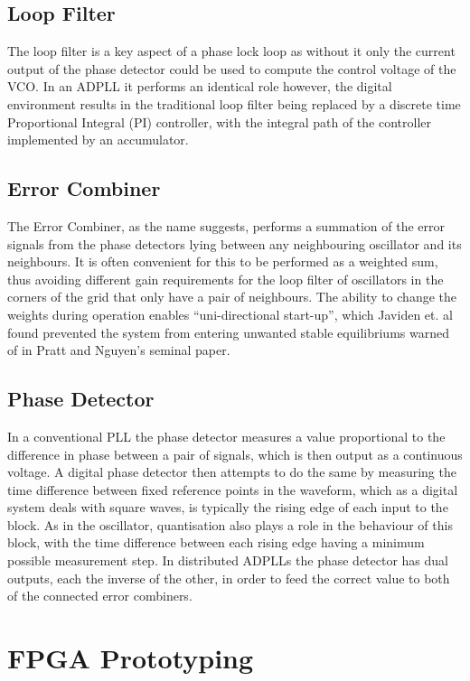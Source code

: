 \documentclass[conference]{IEEEtran}
\begin{document}
\subsection{Loop Filter}
The loop filter is a key aspect of a phase lock loop as without it only the current output of the phase detector could be used to compute the control voltage of the VCO.
In an ADPLL it performs an identical role however, the digital environment results in the traditional loop filter being replaced by a discrete time Proportional Integral (PI) controller, with the integral path of the controller implemented by an accumulator.
\subsection{Error Combiner}
The Error Combiner, as the name suggests, performs a summation of the error signals from the phase detectors lying between any neighbouring oscillator and its neighbours. It is often convenient for this to be performed as a weighted sum, thus avoiding different gain requirements for the loop filter of oscillators in the corners of the grid that only have a pair of neighbours. The ability to change the weights during operation enables ``uni-directional start-up'', which Javiden et. al \cite{javidan2011all} found prevented the system from entering unwanted stable equilibriums warned of in Pratt and Nguyen's seminal paper.
\subsection{Phase Detector}
In a conventional PLL the phase detector measures a value proportional to the difference in phase between a pair of signals, which is then output as a continuous voltage.
A digital phase detector then attempts to do the same by measuring the time difference between fixed reference points in the waveform, which as a digital system deals with square waves, is typically the rising edge of each input to the block.
As in the oscillator, quantisation also plays a role in the behaviour of this block, with the time difference between each rising edge having a minimum possible measurement step.
In distributed ADPLLs the phase detector has dual outputs, each the inverse of the other, in order to feed the correct value to both of the connected error combiners. 

\section{FPGA Prototyping}
\end{document}

